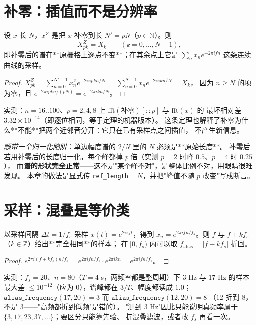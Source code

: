 \section{补零：插值而不是分辨率}

\begin{theorem}[补零 = 三角插值]
\label{thm:zeropad}
设 $x$ 长 $N$，$x^{Z}$ 是把 $x$ 补零到长 $N'=pN$（$p\in\mathbb N$）。则
\[
X^{Z}_{pk}=X_k\qquad(k=0,\dots,N-1),
\]
即补零后的谱在**原栅格上逐点不变**；在其余点上它是
$\sum_n x_n e^{-2\pi i fn}$ 这条连续曲线的采样。
\end{theorem}

\begin{proof}
$X^Z_{pk}=\sum_{n=0}^{N'-1}x^Z_n e^{-2\pi ipkn/N'}=\sum_{n=0}^{N-1}x_n e^{-2\pi ikn/N}=X_k$，
因为 $n\ge N$ 的项为零，且 $e^{-2\pi ipkn/(pN)}=e^{-2\pi ikn/N}$。
\end{proof}

实测：$n=16..100$、$p=2,4,8$ 上 $\mathrm{fft}(\text{补零})[::p]$ 与 $\mathrm{fft}(x)$ 的
最坏相对差 $3.32\times10^{-14}$（即逐位相同，等于定理的机器版本）。
这条定理也解释了补零为什么**不能**把两个近邻音分开：它只在已有采样点之间插值，
不产生新信息。

\emph{顺带一个归一化陷阱}：单边幅度谱的 $2/N$ 里的 $N$ 必须是**原始长度**。
补零后若用补零后的长度归一化，每个峰都掉 $p$ 倍（实测 $p=2$ 时峰 $0.5$、$p=4$ 时 $0.25$），
而\textbf{谱的形状完全正常}——这不是"某个峰不对"，是整体比例不对，用眼睛很难发现。
本章的做法是显式传 \texttt{ref\_length}$=N$，并把"峰值不随 $p$ 改变"写成断言。

\section{采样：混叠是等价类}

\begin{theorem}[混叠]
\label{thm:aliasing}
以采样间隔 $\Delta t=1/f_s$ 采样 $x(t)=e^{2\pi ift}$，得到
$x_n=e^{2\pi ifn/f_s}$。则 $f$ 与 $f+kf_s$（$k\in\mathbb Z$）给出**完全相同**的样本；
在 $[0,f_s)$ 内可以取 $f_{\text{alias}}=|f-kf_s|$ 折回。
\end{theorem}

\begin{proof}
$e^{2\pi i(f+kf_s)n/f_s}=e^{2\pi ifn/f_s}\cdot e^{2\pi ikn}=e^{2\pi ifn/f_s}$。
\end{proof}

实测：$f_s=20$、$n=80$（$T=4$ s，两频率都是整周期）下 $3$ Hz 与 $17$ Hz 的样本
最大差 $\le10^{-12}$（应为 $0$），谱峰都在 $3/T$、幅度都读成 $1.0$；
$\texttt{alias\_frequency}(17,20)=3$ 而 $\texttt{alias\_frequency}(12,20)=8$
（$12$ 折到 $8$，不是 $3$——"高频都折到低频"是错的）。
"测到 $3$ Hz"因此只能说明真频率属于 $\{3,17,23,37,\dots\}$；要区分只能靠先验、
抗混叠滤波，或者改 $f_s$ 再看一次。

